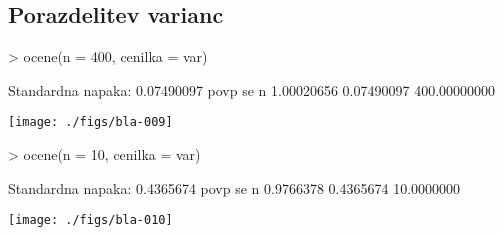 \documentclass[a4paper,12pt]{article}
\begin{document}
\subsection{Porazdelitev varianc}
\begin{Schunk}
\begin{Sinput}
> ocene(n = 400, cenilka = var)
\end{Sinput}
\begin{Soutput}
Standardna napaka: 
 0.07490097 
        povp           se            n 
  1.00020656   0.07490097 400.00000000 
\end{Soutput}
\end{Schunk}
\texttt{[image: ./figs/bla-009]}
\clearpage
\begin{Schunk}
\begin{Sinput}
> ocene(n = 10, cenilka = var)
\end{Sinput}
\begin{Soutput}
Standardna napaka: 
 0.4365674 
      povp         se          n 
 0.9766378  0.4365674 10.0000000 
\end{Soutput}
\end{Schunk}
\texttt{[image: ./figs/bla-010]}

%
%

%

\clearpage
\end{document}

